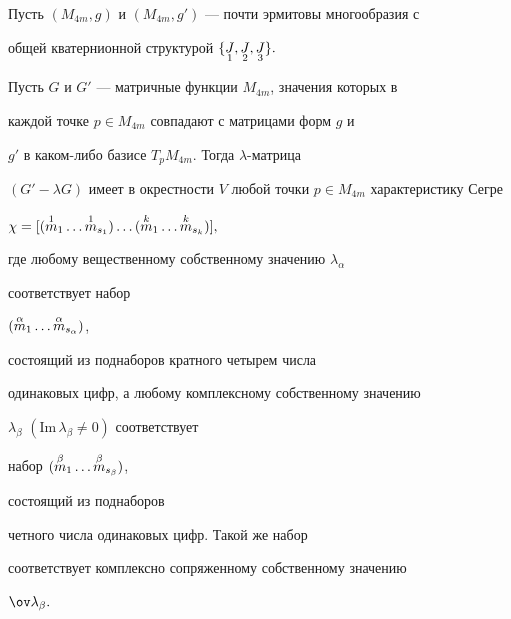 \begin{thm}


Пусть $(M_{4m},g)$ и $(M_{4m},g')$ --- почти эрмитовы многообразия с


общей кватернионной структурой $\{\underset{1}{J},\underset{2}{J},\underset{3}{J}\}.$


Пусть $G$ и $G'$ --- матричные функции $M_{4m}$, значения которых в


каждой точке $p\in M_{4m}$ совпадают с матрицами форм $g$ и


$g'$ в каком-либо базисе $T_pM_{4m}.$ Тогда $\lambda$-матрица


$(G'-\lambda G)$ имеет в окрестности $V$ любой точки $p\in


M_{4m}$ характеристику Сегре


$\chi =[(\up{1}{m}_1\dotsc \up{1}{m}_{s_1})\dotsc


(\up{k}{m}_1\dotsc \up{k}{m}_{s_k})],$


где любому вещественному собственному значению $\lambda_{\alpha}$


соответствует набор


$(\overset{\alpha}{m}_1\dotsc\overset{\alpha}{m}_{s_{\alpha}})$,


состоящий из поднаборов кратного четырем числа


одинаковых цифр, а любому комплексному собственному значению


$\lambda_{\beta}$ $(\mathrm{Im}\, \lambda_{\beta}\neq 0)$ соответствует


набор $(\overset{\beta}{m}_1\dotsc\overset{\beta}{m}_{s_{\beta}})$,


состоящий из поднаборов


четного числа одинаковых цифр. Такой же набор


соответствует комплексно сопряженному собственному значению


$\ov\lambda_{\beta}.$


\end{thm}





